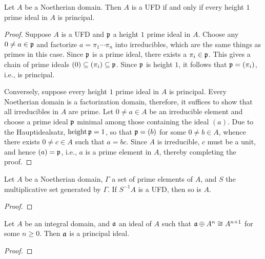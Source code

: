 \begin{theorem}
    Let $A$ be a Noetherian domain. Then $A$ is a UFD if and only if every height $1$ prime ideal in $A$ is principal.
\end{theorem}
\begin{proof}
    Suppose $A$ is a UFD and $\mathfrak{p}$ a height $1$ prime ideal in $A$. Choose any $0\ne a\in\mathfrak{p}$ and factorize $a = \pi_1\cdots\pi_n$ into irreducibles, which are the same things as primes in this case. Since $\mathfrak{p}$ is a prime ideal, there exists a $\pi_i\in\mathfrak{p}$. This gives a chain of prime ideals $(0)\subseteq(\pi_i)\subseteq\mathfrak{p}$. Since $\mathfrak{p}$ is height $1$, it follows that $\mathfrak{p} = (\pi_i)$, i.e., is principal. 

    Conversely, suppose every height $1$ prime ideal in $A$ is principal. Every Noetherian domain is a factorization domain, therefore, it suffices to show that all irreducibles in $A$ are prime. Let $0\ne a\in A$ be an irreducible element and choose a prime ideal $\mathfrak{p}$ minimal among those containing the ideal $(a)$. Due to the Hauptidealsatz, $\operatorname{height}\mathfrak{p} = 1$, so that $\mathfrak{p} = (b)$ for some $0\ne b\in A$, whence there exists $0\ne c\in A$ such that $a = bc$. Since $A$ is irreducible, $c$ must be a unit, and hence $(a) = \mathfrak{p}$, i.e., $a$ is a prime element in $A$, thereby completing the proof.
\end{proof}

\begin{theorem}
    Let $A$ be a Noetherian domain, $\Gamma$ a set of prime elements of $A$, and $S$ the multiplicative set generated by $\Gamma$. If $S^{-1}A$ is a UFD, then so is $A$.
\end{theorem}
\begin{proof}
    
\end{proof}

\begin{lemma}
    Let $A$ be an integral domain, and $\mathfrak{a}$ an ideal of $A$ such that $\mathfrak{a}\oplus A^n\cong A^{n + 1}$ for some $n\ge 0$. Then $\mathfrak{a}$ is a principal ideal.
\end{lemma}
\begin{proof}
\end{proof}